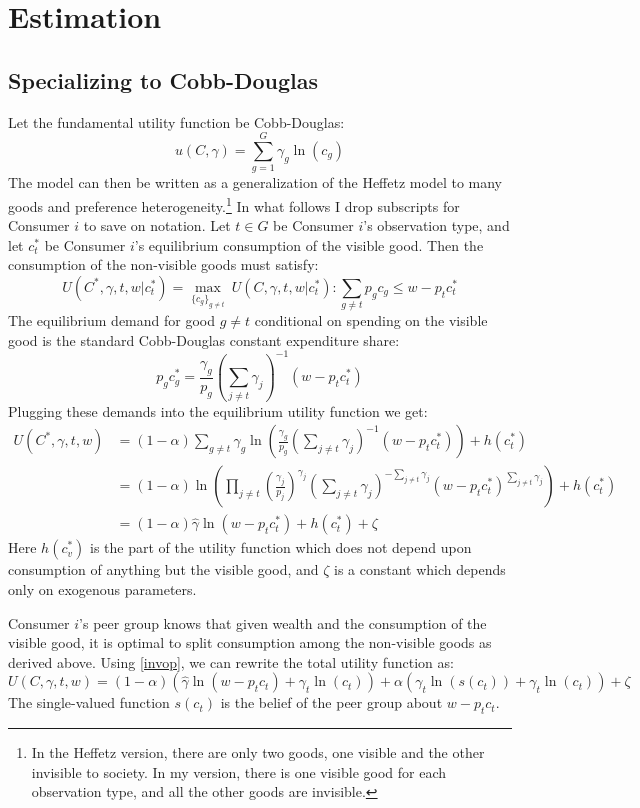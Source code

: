 \documentclass[12pt]{article}
\begin{document}
\section{Estimation}
\subsection{Specializing to Cobb-Douglas}
Let the fundamental utility function be Cobb-Douglas:
\[u(C,\gamma) = \sum_{g=1}^{G} \gamma_g \ln(c_g)\]
The model can then be written as a generalization of the Heffetz model to many goods and preference heterogeneity.\footnote{ In the Heffetz version, there are only two goods, one visible and the other invisible to society. In my version, there is one visible good for each observation type, and all the other goods are invisible.}
In what follows I drop subscripts for Consumer $i$ to save on notation. Let $t \in G$ be Consumer $i$'s observation type, and let $c_{t}^*$ be Consumer $i$'s equilibrium consumption of the visible good.
Then the consumption of the non-visible goods must satisfy:
\[ U(C^*,\gamma,t,w|c_t^*)=\underset{\{c_g\}_{g\neq t}}{\max} \ U(C,\gamma,t,w|c_t^*) :  \sum_{g \neq t} p_g c_g \le w-p_t c_t^*\]
The equilibrium demand for good $g\neq t$ conditional on spending on the visible good is the standard Cobb-Douglas constant expenditure share:
\[p_g c_g^* = \frac{\gamma_g}{p_g}\left(\sum_{j\neq t} \gamma_j\right)^{-1}\left(w-p_t c_t^* \right)\]
Plugging these demands into the equilibrium utility function we get:
\begin{align}
	U(C^*,\gamma,t,w) &= (1-\alpha)\sum_{g\neq t} \gamma_g \ln\left(\frac{\gamma_g}{p_g}\left(\sum_{j\neq t} \gamma_j\right)^{-1}\left(w-p_t c_t^* \right)\right) + h(c_t^*) \nonumber \\ 
	&= (1-\alpha) \ln\left(\prod_{j\neq t} \left(\frac{\gamma_j}{p_j}\right)^{\gamma_j}\left(\sum_{j\neq t} \gamma_j\right)^{-\sum_{j\neq t} \gamma_j}\left(w-p_t c_t^* \right)^{\sum_{j\neq t} \gamma_j}\right) + h(c_t^*) \nonumber \\ 
	\label{invop}
	&= (1-\alpha) \hat{\gamma} \ln \left(w-p_t c_t^*\right) + h(c_t^*) + \zeta
\end{align}
Here $h(c_v^*)$ is the part of the utility function which does not depend upon consumption of anything but the visible good, and $\zeta$ is a constant which depends only on exogenous parameters.

Consumer $i$'s peer group knows that given wealth and the consumption of the visible good, it is optimal to split consumption among the non-visible goods as derived above.  Using \eqref{invop}, we can rewrite the total utility function as: 
\begin{equation}
	\label{ufun}
	U(C,\gamma,t,w) = (1-\alpha) \left(\hat{\gamma} \ln \left(w-p_t c_t\right) + \gamma_t \ln \left(c_t \right)\right) + \alpha \left(\gamma_t \ln \left(s(c_t)\right) + \gamma_t \ln \left(c_t\right) \right) + \zeta
	 \end{equation}
The single-valued function $s(c_t)$ is the belief of the peer group about $w-p_t c_t$. 
\end{document}
